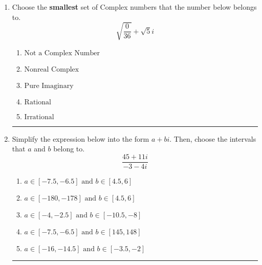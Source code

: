 \documentclass[14pt]{extbook}
\newcommand{\litem}[1]{\item#1\hspace*{-1cm}\rule{\textwidth}{0.4pt}}
\begin{document}
\begin{enumerate}
{\begin{enumerate}[label=\Alph*.]
\end{enumerate} }
\litem{
Choose the \textbf{smallest} set of Complex numbers that the number below belongs to.\[ \sqrt{\frac{0}{36}}+\sqrt{5}i \]\begin{enumerate}[label=\Alph*.]
\item \( \text{Not a Complex Number} \)
\item \( \text{Nonreal Complex} \)
\item \( \text{Pure Imaginary} \)
\item \( \text{Rational} \)
\item \( \text{Irrational} \)

\end{enumerate} }
\litem{
Simplify the expression below into the form $a+bi$. Then, choose the intervals that $a$ and $b$ belong to.\[ \frac{45 + 11 i}{-3 - 4 i} \]\begin{enumerate}[label=\Alph*.]
\item \( a \in [-7.5, -6.5] \text{ and } b \in [4.5, 6] \)
\item \( a \in [-180, -178] \text{ and } b \in [4.5, 6] \)
\item \( a \in [-4, -2.5] \text{ and } b \in [-10.5, -8] \)
\item \( a \in [-7.5, -6.5] \text{ and } b \in [145, 148] \)
\item \( a \in [-16, -14.5] \text{ and } b \in [-3.5, -2] \)

\end{enumerate} }
\end{enumerate}
\end{document}
